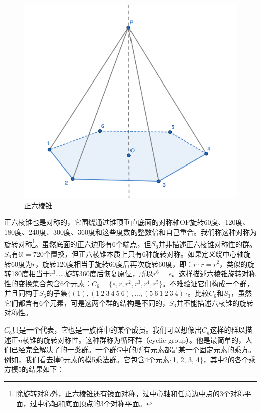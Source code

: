 \documentclass[b5paper]{ctexart}
\begin{document}
\begin{figure}[htbp]
 \centering
 \includegraphics[scale=0.8]{img/hexagonal-pyramid.png}
 \caption{正六棱锥}
 \label{fig:regular-hexagonal-pyramid}
\end{figure}

正六棱锥也是对称的，它围绕通过锥顶垂直底面的对称轴OP旋转60度、120度、180度、240度、300度、360度和这些度数的整数倍和自己重合。我们称这种对称为旋转对称\footnote{除旋转对称外，正六棱锥还有镜面对称，过中心轴和任意边中点的3个对称平面，过中心轴和底面顶点的3个对称平面。}。虽然底面的正六边形有6个端点，但$S_6$并非描述正六棱锥对称性的群。$S_6$有$6! = 720$个置换，但正六棱锥本质上只有6种旋转对称。如果定义绕中心轴旋转60度为$r$，旋转120度相当于旋转60度后再次旋转60度，即：$r \cdot r = r^2$，类似的旋转180度相当于$r^3$……旋转360度后恢复原位，所以$r^6 = e$。这样描述六棱锥旋转对称性的变换集合包含6个元素：$C_6 = \{e, r, r^2, r^3, r^4, r^5\}$。不难验证它们构成一个群，并且同构于$S_6$的子集$\{(1), (1\ 2\ 3\ 4\ 5\ 6), ..., (5\ 6\ 1\ 2\ 3\ 4)\}$。比较$C_6$和$S_3$，虽然它们都含有6个元素，可是这两个群的结构是不同的，$S_3$并不能描述六棱锥的旋转对称性。

$C_6$只是一个代表，它也是一族群中的某个成员。我们可以想像出$C_n$这样的群以描述正$n$棱锥的旋转对称性。这种群称为循环群（cyclic group）。他是最简单的，人们已经完全解决了的一类群。一个群$G$中的所有元素都是某一个固定元素的乘方。例如，我们看去掉0元素的模5乘法群。它包含4个元素\{1, 2, 3, 4\}，其中2的各个乘方模5的结果如下：
\end{document}
